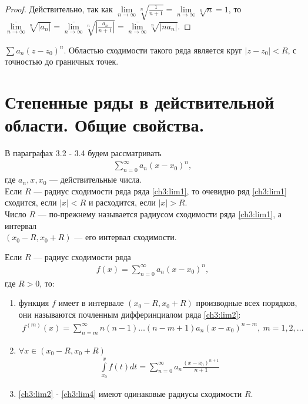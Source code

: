 \begin{proof}
  Действительно, так как $\lim\limits_{n \to \infty} \sqrt[n]{\frac{1}{n + 1}}=
  \lim\limits_{n \to \infty} \sqrt[n]{n} = 1$, то \\
  $\overline{\lim\limits_{n \to \infty}} \sqrt[n]{|a_n|} =
  \overline{\lim\limits_{n \to \infty}} \sqrt[n]{\left|\frac{a_n}{n + 1}\right|}=
  \overline{\lim\limits_{n \to \infty}} \sqrt[n]{|n a_n|}$.
\end{proof}

\begin{example}
  $\sum a_n (z - z_0)^n$.
  Областью сходимости такого ряда является круг $|z - z_0| < R$, с точностью до
  граничных точек.
\end{example}

\section{Степенные ряды в действительной области. Общие свойства.}
В параграфах 3.2 - 3.4 будем рассматривать
\begin{gather}
  \sum\limits_{n = 0}^{\infty} a_n (x - x_0)^n,
  \label{ch3:lim1}
\end{gather}
где $a_n, x, x_0$ --- действительные числа. \\
Если $R$ --- радиус сходимости ряда ряда \eqref{ch3:lim1}, то очевидно ряд
\eqref{ch3:lim1} сходится, если $|x| < R$ и расходится, если $|x| > R$. \\
Число $R$ --- по-прежнему называется радиусом сходимости ряда \eqref{ch3:lim1},
а интервал \\ $(x_0 - R, x_0 + R)$ --- его интервал сходимости.

\begin{theorem}
  \label{th321}
  Если $R$ --- радиус сходимости ряда
  \begin{gather}
    f(x) = \sum\limits_{n = 0}^{\infty} a_n (x - x_0)^n,
    \label{ch3:lim2}
  \end{gather}
  где $R > 0$, то:
  \begin{enumerate}
    \item функция $f$ имеет в интервале $(x_0 - R, x_0 + R)$ производные всех
      порядков, они называются почленным дифферинциалом ряда \eqref{ch3:lim2}:
      \begin{gather}
        f^{(m)}(x) = \sum\limits_{n = m}^{\infty} n(n-1)\dots(n - m + 1)
        a_n(x - x_0)^{n-m}, \ m = 1, 2, \dots
        \label{ch3:lim3}
      \end{gather}
    \item $\forall x \in (x_0 - R, x_0 + R)$
      \begin{gather}
        \int\limits_{x_0}^x f(t) dt = \sum\limits_{n = 0}^{\infty} a_n
        \frac{(x - x_0)^{n+1}}{n+1}
        \label{ch3:lim4}
      \end{gather}
    \item \eqref{ch3:lim2} - \eqref{ch3:lim4} имеют одинаковые радиусы сходимости
      $R$.
  \end{enumerate}
\end{theorem}

